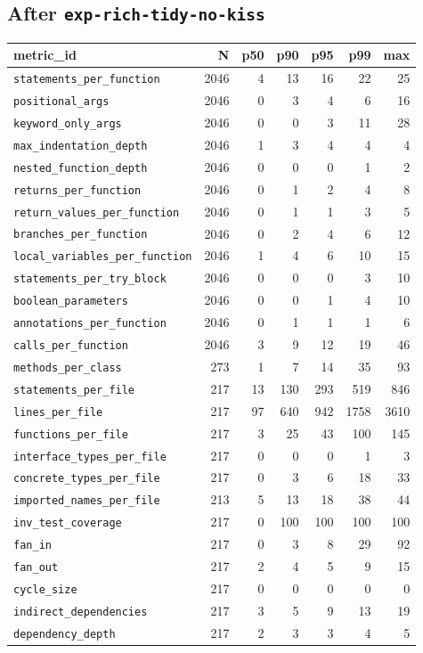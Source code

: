\documentclass[11pt]{article}
\begin{document}
\subsection{After \texttt{exp-rich-tidy-no-kiss}}
\label{app:kiss-no-kiss}

{\scriptsize
\begin{longtable}{@{}lrrrrrr@{}}
  \toprule
  metric\_id & N & p50 & p90 & p95 & p99 & max \\
  \midrule
  \endhead
  \texttt{statements\_per\_function} & 2046 & 4 & 13 & 16 & 22 & 25 \\
  \texttt{positional\_args} & 2046 & 0 & 3 & 4 & 6 & 16 \\
  \texttt{keyword\_only\_args} & 2046 & 0 & 0 & 3 & 11 & 28 \\
  \texttt{max\_indentation\_depth} & 2046 & 1 & 3 & 4 & 4 & 4 \\
  \texttt{nested\_function\_depth} & 2046 & 0 & 0 & 0 & 1 & 2 \\
  \texttt{returns\_per\_function} & 2046 & 0 & 1 & 2 & 4 & 8 \\
  \texttt{return\_values\_per\_function} & 2046 & 0 & 1 & 1 & 3 & 5 \\
  \texttt{branches\_per\_function} & 2046 & 0 & 2 & 4 & 6 & 12 \\
  \texttt{local\_variables\_per\_function} & 2046 & 1 & 4 & 6 & 10 & 15 \\
  \texttt{statements\_per\_try\_block} & 2046 & 0 & 0 & 0 & 3 & 10 \\
  \texttt{boolean\_parameters} & 2046 & 0 & 0 & 1 & 4 & 10 \\
  \texttt{annotations\_per\_function} & 2046 & 0 & 1 & 1 & 1 & 6 \\
  \texttt{calls\_per\_function} & 2046 & 3 & 9 & 12 & 19 & 46 \\
  \texttt{methods\_per\_class} & 273 & 1 & 7 & 14 & 35 & 93 \\
  \texttt{statements\_per\_file} & 217 & 13 & 130 & 293 & 519 & 846 \\
  \texttt{lines\_per\_file} & 217 & 97 & 640 & 942 & 1758 & 3610 \\
  \texttt{functions\_per\_file} & 217 & 3 & 25 & 43 & 100 & 145 \\
  \texttt{interface\_types\_per\_file} & 217 & 0 & 0 & 0 & 1 & 3 \\
  \texttt{concrete\_types\_per\_file} & 217 & 0 & 3 & 6 & 18 & 33 \\
  \texttt{imported\_names\_per\_file} & 213 & 5 & 13 & 18 & 38 & 44 \\
  \texttt{inv\_test\_coverage} & 217 & 0 & 100 & 100 & 100 & 100 \\
  \texttt{fan\_in} & 217 & 0 & 3 & 8 & 29 & 92 \\
  \texttt{fan\_out} & 217 & 2 & 4 & 5 & 9 & 15 \\
  \texttt{cycle\_size} & 217 & 0 & 0 & 0 & 0 & 0 \\
  \texttt{indirect\_dependencies} & 217 & 3 & 5 & 9 & 13 & 19 \\
  \texttt{dependency\_depth} & 217 & 2 & 3 & 3 & 4 & 5 \\
  \bottomrule
\end{longtable}
}
\end{document}
